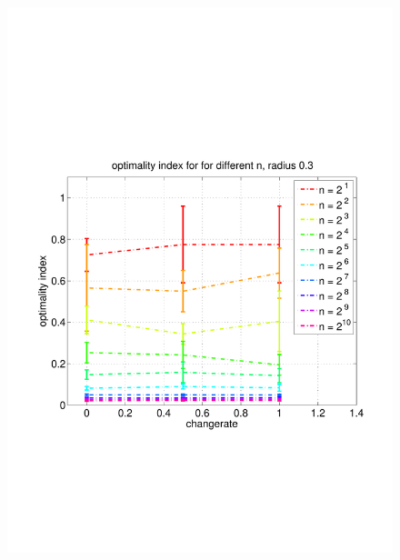\documentclass[11pt]{article}
\begin{document}
\begin{figure}
	\includegraphics[width=\linewidth]{../../code/data/2014_12_12_00_55_41/figure_9}
\end{figure}
\end{document}
